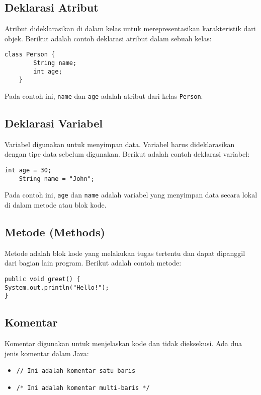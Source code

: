 \subsection{Deklarasi Atribut}
Atribut dideklarasikan di dalam kelas untuk merepresentasikan karakteristik dari objek. Berikut adalah contoh deklarasi atribut dalam sebuah kelas:

\begin{lstlisting}[style=JavaStyle]
	class Person {
		String name;
		int age;
	}
\end{lstlisting}

Pada contoh ini, \texttt{name} dan \texttt{age} adalah atribut dari kelas \texttt{Person}.

\subsection{Deklarasi Variabel}
Variabel digunakan untuk menyimpan data. Variabel harus dideklarasikan dengan tipe data sebelum digunakan. Berikut adalah contoh deklarasi variabel:

\begin{lstlisting}[style=JavaStyle]
	int age = 30;
	String name = "John";
\end{lstlisting}

Pada contoh ini, \texttt{age} dan \texttt{name} adalah variabel yang menyimpan data secara lokal di dalam metode atau blok kode.


\subsection{Metode (Methods)}

Metode adalah blok kode yang melakukan tugas tertentu dan dapat dipanggil dari bagian lain program. Berikut adalah contoh metode:

\begin{lstlisting}[style=JavaStyle]
public void greet() {
System.out.println("Hello!");
}
\end{lstlisting}

\subsection{Komentar}

Komentar digunakan untuk menjelaskan kode dan tidak dieksekusi. Ada dua jenis komentar dalam Java:

\begin{itemize}
\item \texttt{// Ini adalah komentar satu baris}
\item \texttt{/* Ini adalah komentar multi-baris */}
\end{itemize}

